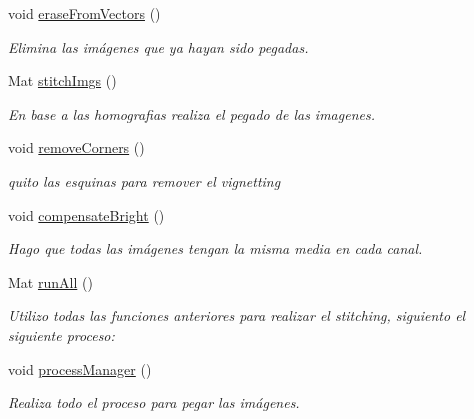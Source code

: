 \begin{DoxyCompactItemize}
\mbox{\label{classuav_1_1Stitcher_a58dc76aa6524d65d9af960d12effe26b}} 
void \mbox{\hyperlink{classuav_1_1Stitcher_a58dc76aa6524d65d9af960d12effe26b}{erase\+From\+Vectors}} ()
\begin{DoxyCompactList}\small\item\em Elimina las imágenes que ya hayan sido pegadas. \end{DoxyCompactList}\item 
Mat \mbox{\hyperlink{classuav_1_1Stitcher_a650ea572d679be3b9ca07e142508a324}{stitch\+Imgs}} ()
\begin{DoxyCompactList}\small\item\em En base a las homografias realiza el pegado de las imagenes. \end{DoxyCompactList}\item 
\mbox{\label{classuav_1_1Stitcher_ab52ee0552b5e12dae2cd157ddc29cab2}} 
void \mbox{\hyperlink{classuav_1_1Stitcher_ab52ee0552b5e12dae2cd157ddc29cab2}{remove\+Corners}} ()
\begin{DoxyCompactList}\small\item\em quito las esquinas para remover el vignetting \end{DoxyCompactList}\item 
\mbox{\label{classuav_1_1Stitcher_a75bb9ec1e173c137d53f650dd9077460}} 
void \mbox{\hyperlink{classuav_1_1Stitcher_a75bb9ec1e173c137d53f650dd9077460}{compensate\+Bright}} ()
\begin{DoxyCompactList}\small\item\em Hago que todas las imágenes tengan la misma media en cada canal. \end{DoxyCompactList}\item 
Mat \mbox{\hyperlink{classuav_1_1Stitcher_a0b78aba00328166db74d46884485f3bd}{run\+All}} ()
\begin{DoxyCompactList}\small\item\em Utilizo todas las funciones anteriores para realizar el stitching, siguiento el siguiente proceso\+: \end{DoxyCompactList}\item 
\mbox{\label{classuav_1_1Stitcher_ac4616d6a6ed8e7aaf7b41464ed4b85d8}} 
void \mbox{\hyperlink{classuav_1_1Stitcher_ac4616d6a6ed8e7aaf7b41464ed4b85d8}{process\+Manager}} ()
\begin{DoxyCompactList}\small\item\em Realiza todo el proceso para pegar las imágenes. \end{DoxyCompactList}\item 

\end{DoxyCompactItemize}

